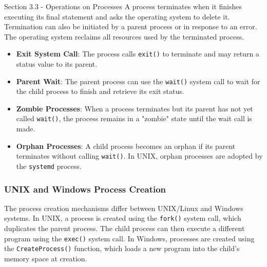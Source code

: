 \begin{notes}{Section 3.3 - Operations on Processes}
    A process terminates when it finishes executing its final statement and asks the operating system to delete it. Termination can also be initiated by a parent process or in response to an error. 
    The operating system reclaims all resources used by the terminated process.
    
    \begin{highlight}
    
        \begin{itemize}
            \item \textbf{Exit System Call}: The process calls \texttt{exit()} to terminate and may return a status value to its parent.
            \item \textbf{Parent Wait}: The parent process can use the \texttt{wait()} system call to wait for the child process to finish and retrieve its exit status.
            \item \textbf{Zombie Processes}: When a process terminates but its parent has not yet called \texttt{wait()}, the process remains in a "zombie" state until the wait call is made.
            \item \textbf{Orphan Processes}: A child process becomes an orphan if its parent terminates without calling \texttt{wait()}. In UNIX, orphan processes are adopted by the \texttt{systemd} process.
        \end{itemize}
    
    \end{highlight}
    
    \subsubsection*{UNIX and Windows Process Creation}
    
    The process creation mechanisms differ between UNIX/Linux and Windows systems. In UNIX, a process is created using the \texttt{fork()} system call, which duplicates the parent process. The child 
    process can then execute a different program using the \texttt{exec()} system call. In Windows, processes are created using the \texttt{CreateProcess()} function, which loads a new program into 
    the child's memory space at creation.
    
    \begin{highlight}
    

\end{highlight}
\end{notes}
